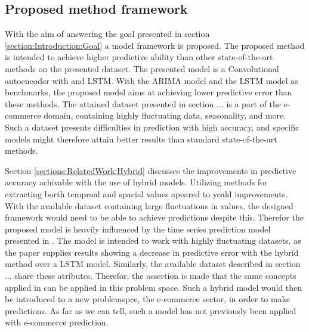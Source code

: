 \subsection{Proposed method framework}


\todo[inline]{}


With the aim of answering the goal presented in section \ref{section:Introduction:Goal} a model framework is proposed.
The proposed method is intended to achieve higher predictive ability than other state-of-the-art methods on the presented dataset.
The presented model is a Convolutional autoencoder with and LSTM.
With the ARIMA model and the LSTM model as benchmarks, the proposed model aims at achieving lower predictive error than these methods.
The attained dataset presented in section ... is a part of the e-commerce domain, containing highly fluctuating data, seasonality, and more.
Such a dataset presents difficulties in prediction with high accuracy, and specific models might therefore attain better results than standard state-of-the-art methods.

Section \ref{sections:RelatedWork:Hybrid} discusses the improvements in predictive accuracy achivable with the use of hybrid models.
Utilizing methods for extracting borth temproal and spacial values apeared to yeald improvements.
With the available dataset containing large fluctuations in values, the designed framework would need to be able to achieve predictions despite this.
Therefor the proposed model is heavily influenced by the time series prediction model presented in \cite{Zhao2019}.
The model is intended to work with highly fluctuating datasets, as the paper supplies results showing a decrease in predictive error with the hybrid method over a LSTM model.
Similarly, the available dataset described in section ... share these atributes.
Therefor, the assertion is made that the same concepts applied in \cite{Zhao2019} can be applied in this problem space.
Such a hybrid model would then be introduced to a new problemspce, the e-commerce sector, in order to make predictions.
As far as we can tell, such a model has not previously been applied with e-commerce prediction.

